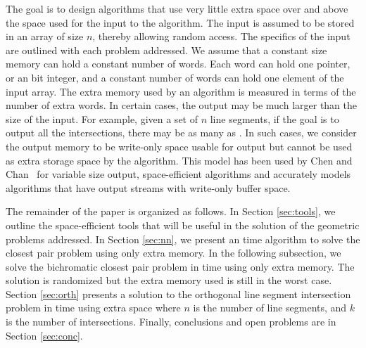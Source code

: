 The goal is to design algorithms that use very little extra space over
and above the space used for the input to the algorithm. The input is
assumed to be stored in an array of size $n$, thereby allowing random
access.  The specifics of the input are outlined with each problem
addressed.  We assume that a constant size memory can hold a constant
number of words. Each word can hold one pointer, or an  bit
integer, and a constant number of words can hold one element of the
input array. The extra memory used by an algorithm is measured in
terms of the number of extra words. In certain cases, the output may
be much larger than the size of the input. For example, given a set of
$n$ line segments, if the goal is to output all the intersections,
there may be as many as . In such cases, we consider the
output memory to be write-only space usable for output but cannot be
used as extra storage space by the algorithm.  This model has been
used by Chen and Chan~\cite{chen:space-efficient} for variable size
output, space-efficient algorithms and accurately models algorithms
that have output streams with write-only buffer space.

The remainder of the paper is organized as follows. In Section
\ref{sec:tools}, we outline the space-efficient tools that will be
useful in the solution of the geometric problems addressed. In Section
\ref{sec:nn}, we present an  time algorithm to solve the
closest pair problem using only  extra memory. In the following
subsection, we solve the bichromatic closest pair problem in  time using only  extra memory. The solution is
randomized but the extra memory used is still  in the worst
case.  Section \ref{sec:orth} presents a solution to the orthogonal
line segment intersection problem in  time using
 extra space where $n$ is the number of line segments, and
$k$ is the number of intersections.  Finally, conclusions and open
problems are in Section \ref{sec:conc}.


%
%
